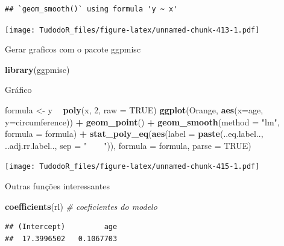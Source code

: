 \documentclass[
]{book}
\newenvironment{Shaded}{\begin{snugshade}}{\end{snugshade}}
\newcommand{\CommentTok}[1]{\textcolor[rgb]{0.56,0.35,0.01}{\textit{#1}}}
\newcommand{\DataTypeTok}[1]{\textcolor[rgb]{0.13,0.29,0.53}{#1}}
\newcommand{\DecValTok}[1]{\textcolor[rgb]{0.00,0.00,0.81}{#1}}
\newcommand{\KeywordTok}[1]{\textcolor[rgb]{0.13,0.29,0.53}{\textbf{#1}}}
\newcommand{\NormalTok}[1]{#1}
\newcommand{\OperatorTok}[1]{\textcolor[rgb]{0.81,0.36,0.00}{\textbf{#1}}}
\newcommand{\OtherTok}[1]{\textcolor[rgb]{0.56,0.35,0.01}{#1}}
\newcommand{\StringTok}[1]{\textcolor[rgb]{0.31,0.60,0.02}{#1}}
\begin{document}
\begin{verbatim}
## `geom_smooth()` using formula 'y ~ x'
\end{verbatim}

\texttt{[image: TudodoR\_files/figure-latex/unnamed-chunk-413-1.pdf]}

Gerar graficos com o pacote ggpmisc

\begin{Shaded}
\begin{Highlighting}[]
\KeywordTok{library}\NormalTok{(ggpmisc)}
\end{Highlighting}
\end{Shaded}

Gráfico

\begin{Shaded}
\begin{Highlighting}[]
\NormalTok{formula <-}\StringTok{ }\NormalTok{y }\OperatorTok{~}\StringTok{ }\KeywordTok{poly}\NormalTok{(x, }\DecValTok{2}\NormalTok{, }\DataTypeTok{raw =} \OtherTok{TRUE}\NormalTok{)}
\KeywordTok{ggplot}\NormalTok{(Orange, }\KeywordTok{aes}\NormalTok{(}\DataTypeTok{x=}\NormalTok{age, }\DataTypeTok{y=}\NormalTok{circumference)) }\OperatorTok{+}
\StringTok{  }\KeywordTok{geom_point}\NormalTok{() }\OperatorTok{+}
\StringTok{  }\KeywordTok{geom_smooth}\NormalTok{(}\DataTypeTok{method =} \StringTok{"lm"}\NormalTok{, }\DataTypeTok{formula =}\NormalTok{ formula) }\OperatorTok{+}
\StringTok{  }\KeywordTok{stat_poly_eq}\NormalTok{(}\KeywordTok{aes}\NormalTok{(}\DataTypeTok{label =}  \KeywordTok{paste}\NormalTok{(..eq.label.., ..adj.rr.label.., }\DataTypeTok{sep =} \StringTok{"~~~~"}\NormalTok{)),}
    \DataTypeTok{formula =}\NormalTok{ formula, }\DataTypeTok{parse =} \OtherTok{TRUE}\NormalTok{)}
\end{Highlighting}
\end{Shaded}

\texttt{[image: TudodoR\_files/figure-latex/unnamed-chunk-415-1.pdf]}

Outras funções interessantes

\begin{Shaded}
\begin{Highlighting}[]
\KeywordTok{coefficients}\NormalTok{(rl) }\CommentTok{# coeficientes do modelo}
\end{Highlighting}
\end{Shaded}

\begin{verbatim}
## (Intercept)         age 
##  17.3996502   0.1067703
\end{verbatim}
\end{document}
